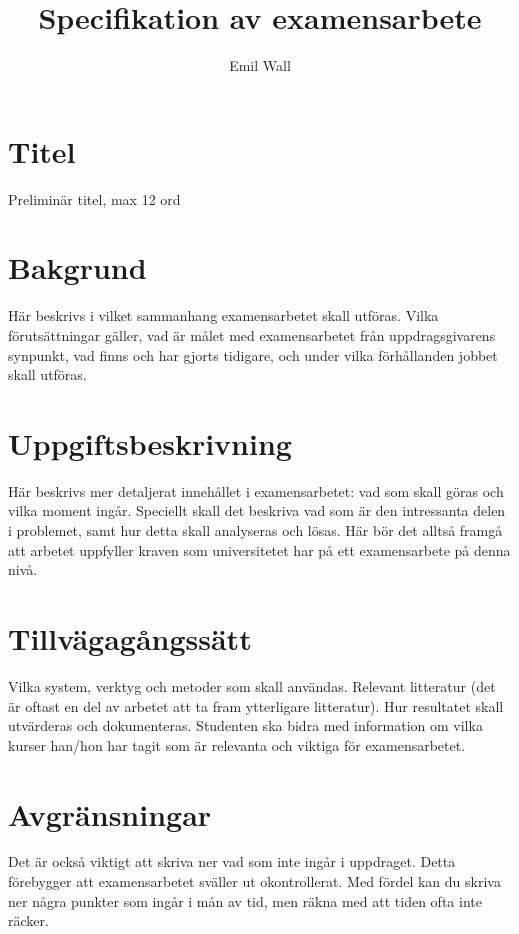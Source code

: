 \documentclass[12pt]{article}
\title{Specifikation av examensarbete}
\author{Emil Wall}
\begin{document}
\maketitle

\vspace{10mm}

\section{Titel}

Preliminär titel, max 12 ord

\section{Bakgrund}

Här beskrivs i vilket sammanhang examensarbetet skall utföras. Vilka förutsättningar gäller, vad är målet med examensarbetet från uppdragsgivarens synpunkt, vad finns och har gjorts tidigare, och under vilka förhållanden jobbet skall utföras.

\section{Uppgiftsbeskrivning}

Här beskrivs mer detaljerat innehållet i examensarbetet: vad som skall göras och vilka moment ingår. Speciellt skall det beskriva vad som är den intressanta delen i problemet, samt hur detta skall analyseras och lösas. Här bör det alltså framgå att arbetet uppfyller kraven som universitetet har på ett examensarbete på denna nivå.

\section{Tillvägagångssätt}

Vilka system, verktyg och metoder som skall användas. Relevant litteratur (det är oftast en del av arbetet att ta fram ytterligare litteratur). Hur resultatet skall utvärderas och dokumenteras. Studenten ska bidra med information om vilka kurser han/hon har tagit som är relevanta och viktiga för examensarbetet.

\section{Avgränsningar}

Det är också viktigt att skriva ner vad som inte ingår i uppdraget. Detta förebygger att examensarbetet sväller ut okontrollerat. Med fördel kan du skriva ner några punkter som ingår i mån av tid, men räkna med att tiden ofta inte räcker.
\end{document}
